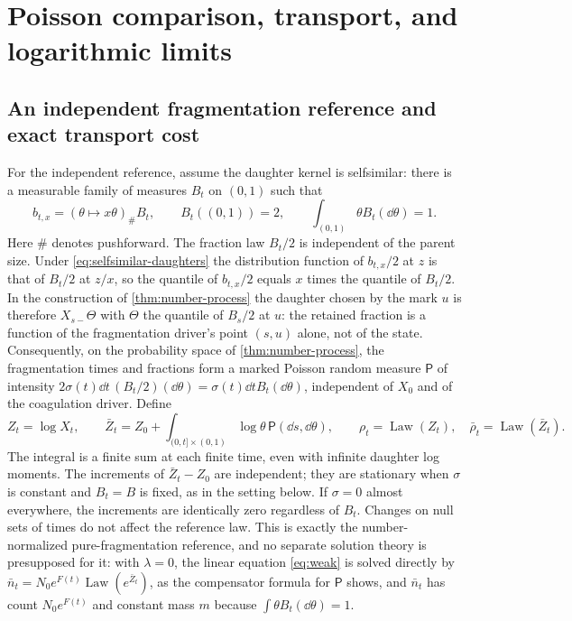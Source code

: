 \section{Poisson comparison, transport, and logarithmic limits}
\label{sec:log-limits}

\subsection{An independent fragmentation reference and exact transport cost}

For the independent reference, assume the daughter kernel is selfsimilar:
there is a measurable family of measures $B_t$ on $(0,1)$ such that
\begin{equation}
 b_{t,x}=(\theta\mapsto x\theta)_\#B_t,\qquad
 B_t((0,1))=2,\qquad \int_{(0,1)}\theta B_t(\dd\theta)=1.
 \label{eq:selfsimilar-daughters}
\end{equation}
Here $\#$ denotes pushforward. The fraction law $B_t/2$ is independent
of the parent size. Under \eqref{eq:selfsimilar-daughters} the
distribution function of $b_{t,x}/2$ at $z$ is that of $B_t/2$ at
$z/x$, so the quantile of $b_{t,x}/2$ equals $x$ times the quantile
of $B_t/2$. In the construction of \cref{thm:number-process} the
daughter chosen by the mark $u$ is therefore $X_{s-}\Theta$ with
$\Theta$ the quantile of $B_s/2$ at $u$: the retained fraction is a
function of the fragmentation driver's point $(s,u)$ alone, not of
the state. Consequently, on the probability space of
\cref{thm:number-process}, the fragmentation times and fractions form
a marked Poisson random measure $\mathsf P$ of intensity
$2\sigma(t)\dd t\,(B_t/2)(\dd\theta)=\sigma(t)\dd t B_t(\dd\theta)$,
independent of $X_0$ and of the coagulation driver. Define
\begin{equation}
 Z_t=\log X_t,\qquad
 \bar Z_t=Z_0+\int_{(0,t]\times(0,1)}\log\theta\,
                         \mathsf P(\dd s,\dd\theta),\qquad
 \rho_t=\operatorname{Law}(Z_t),\quad
 \bar\rho_t=\operatorname{Law}(\bar Z_t).
 \label{eq:poisson-reference}
\end{equation}
The integral is a finite sum at each finite time, even with infinite
daughter log moments. The increments of $\bar Z_t-Z_0$ are independent;
they are stationary when $\sigma$ is constant and $B_t=B$ is fixed,
as in the setting below. If $\sigma=0$ almost everywhere, the increments
are identically zero regardless of $B_t$. Changes on null sets of times
do not affect the reference law.
This is exactly the number-normalized pure-fragmentation reference,
and no separate solution theory is presupposed for it: with
$\lambda=0$, the linear equation \eqref{eq:weak} is solved directly
by $\bar n_t=N_0e^{F(t)}\operatorname{Law}(e^{\bar Z_t})$, as the
compensator formula for $\mathsf P$ shows, and $\bar n_t$ has count
$N_0e^{F(t)}$ and constant mass $m$ because
$\int\theta B_t(\dd\theta)=1$.

